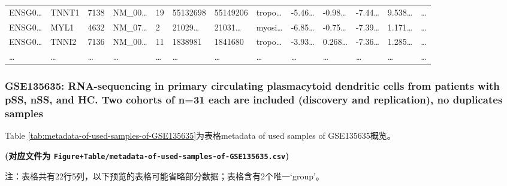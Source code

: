 \documentclass[
]{article}
\begin{document}
\begin{longtable}[]{@{}lllllllllllll@{}}
ENSG0\ldots{} & TNNT1 & 7138 & NM\_00\ldots{} & 19 & 55132698 & 55149206 & tropo\ldots{} & -5.46\ldots{} & -0.98\ldots{} & -7.44\ldots{} & 9.538\ldots{} & \ldots{}\tabularnewline
ENSG0\ldots{} & MYL1 & 4632 & NM\_07\ldots{} & 2 & 21029\ldots{} & 21031\ldots{} & myosi\ldots{} & -6.85\ldots{} & -0.75\ldots{} & -7.39\ldots{} & 1.171\ldots{} & \ldots{}\tabularnewline
ENSG0\ldots{} & TNNI2 & 7136 & NM\_00\ldots{} & 11 & 1838981 & 1841680 & tropo\ldots{} & -3.93\ldots{} & 0.268\ldots{} & -7.36\ldots{} & 1.285\ldots{} & \ldots{}\tabularnewline
\ldots{} & \ldots{} & \ldots{} & \ldots{} & \ldots{} & \ldots{} & \ldots{} & \ldots{} & \ldots{} & \ldots{} & \ldots{} & \ldots{} & \ldots{}\tabularnewline
\bottomrule
\end{longtable}

\hypertarget{gse135635-rna-sequencing-in-primary-circulating-plasmacytoid-dendritic-cells-from-patients-with-pss-nss-and-hc.-two-cohorts-of-n31-each-are-included-discovery-and-replication-no-duplicates-samples}{%
\subsubsection{GSE135635: RNA-sequencing in primary circulating plasmacytoid dendritic cells from patients with pSS, nSS, and HC. Two cohorts of n=31 each are included (discovery and replication), no duplicates samples}\label{gse135635-rna-sequencing-in-primary-circulating-plasmacytoid-dendritic-cells-from-patients-with-pss-nss-and-hc.-two-cohorts-of-n31-each-are-included-discovery-and-replication-no-duplicates-samples}}

Table \ref{tab:metadata-of-used-samples-of-GSE135635}为表格metadata of used samples of GSE135635概览。

\textbf{(对应文件为 \texttt{Figure+Table/metadata-of-used-samples-of-GSE135635.csv})}

\begin{center}\begin{tcolorbox}[colback=gray!10, colframe=gray!50, width=0.9\linewidth, arc=1mm, boxrule=0.5pt]注：表格共有22行5列，以下预览的表格可能省略部分数据；表格含有2个唯一`group'。
\end{tcolorbox}
\end{center}
\end{document}
